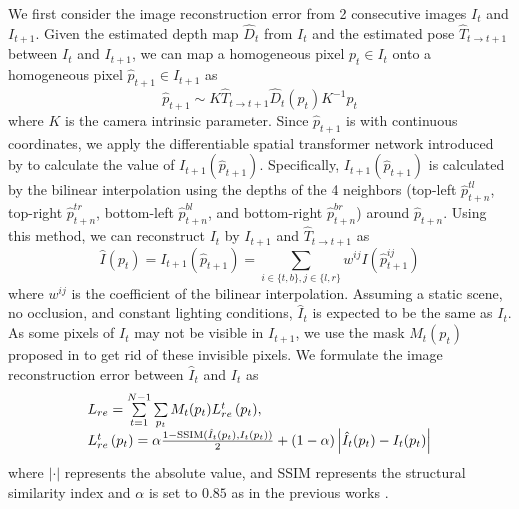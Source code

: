 \documentclass[10pt,twocolumn,letterpaper]{article}
\begin{document}
We first consider the image reconstruction error from 2 consecutive images ${{I}_{t}}$ and ${{I}_{t+1}}$. Given the estimated depth map ${{\hat{D}}_{t}}$ from ${{I}_{t}}$ and the estimated pose ${{\hat{T}}_{t\to t+1}}$ between ${{I}_{t}}$ and ${{I}_{t+1}}$, we can map a homogeneous pixel ${{p}_{t}}\in {{I}_{t}}$ onto a homogeneous pixel ${{\hat{p}}_{t+1}}\in {{I}_{t+1}}$ as
\begin{equation} \label{equ:prejection}
{\hat p_{t + 1}} \sim K{\hat T_{t \to t + 1}}{\hat D_t}\left( {{p_t}} \right){K^{ - 1}}{p_t}
\end{equation}
where $K$ is the camera intrinsic parameter. Since ${{\hat{p}}_{t+1}}$ is with continuous coordinates, we apply the differentiable spatial transformer network introduced by \cite{jaderberg2015spatial} to calculate the value of ${{I}_{t+1}}\left( {{{\hat{p}}}_{t+1}} \right)$. Specifically, ${{I}_{t+1}}\left( {{{\hat{p}}}_{t+1}} \right)$ is calculated by the bilinear interpolation using the depths of the 4 neighbors (top-left $\hat{p}_{t+n}^{tl}$, top-right $\hat{p}_{t+n}^{tr}$, bottom-left $\hat{p}_{t+n}^{bl}$, and bottom-right $\hat{p}_{t+n}^{br}$) around ${{\hat{p}}_{t+n}}$. Using this method, we can reconstruct ${{I}_{t}}$ by ${{I}_{t+1}}$ and ${{\hat{T}}_{t\to t+1}}$ as
\begin{equation} \label{equ:view_synthesis}
\hat I\left( {{p_t}} \right) = {I_{t + 1}}\left( {{{\hat p}_{t + 1}}} \right) = \sum\limits_{i \in \{ t,b\} ,j \in \{ l,r\} } {{w^{ij}}I\left( {\hat p_{t + 1}^{ij}} \right)}  
\end{equation}
where ${{w}^{ij}}$ is the coefficient of the bilinear interpolation.   Assuming a static scene, no occlusion, and constant lighting conditions, ${{\hat{I}}_{t}}$ is expected to be the same as ${{I}_{t}}$. As some pixels of ${{I}_{t}}$ may not be visible in ${{I}_{t+1}}$, we use the mask ${{M}_{t}}\left( {{p}_{t}} \right)$ proposed in \cite{mahjourian2018unsupervised} to get rid of these invisible pixels. We formulate the image reconstruction error between ${{\hat{I}}_{t}}$ and ${{I}_{t}}$ as
\begin{equation} \label{equ:lre}
	\begin{array}{l}
	{L_{re}} = \sum\limits_{t = 1}^{N - 1} {\sum\limits_{{p_t}} {{M_t}({p_t})L_{re}^t\left( {{p_t}} \right)} } ,\\
	L_{re}^t\left( {{p_t}} \right) = \alpha \frac{{1 - {\rm{SSIM(}}{{\hat I}_t}({p_t}),{I_t}({p_t}){\rm{)}}}}{2} + (1 - \alpha )\left| {{{\hat I}_t}({p_t}) - {I_t}({p_t})} \right|
	\end{array}
\end{equation}
where $|\cdot |$ represents the absolute value, and SSIM represents the structural similarity index \cite{wang2004image} and $\alpha $ is set to $0.85$ as in the previous works \cite{godard2017unsupervised,wang2018learning}.
\end{document}
